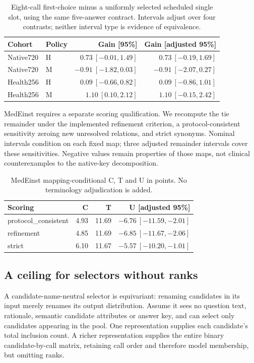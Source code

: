 \begin{table}[ht]
\centering\small
\caption{Eight-call first-choice minus a uniformly selected scheduled single slot, using the same five-answer contract. Intervals adjust over four contrasts; neither interval type is evidence of equivalence.}
\begin{tabular}{llrr}
\toprule
Cohort & Policy & Gain [95\%] & Gain [adjusted 95\%]\\
\midrule
Native720 & H & $0.73\ [-0.01,1.49]$ & $0.73\ [-0.19,1.69]$\\
Native720 & M & $-0.91\ [-1.82,0.03]$ & $-0.91\ [-2.07,0.27]$\\
Health256 & H & $0.09\ [-0.66,0.82]$ & $0.09\ [-0.86,1.01]$\\
Health256 & M & $1.10\ [0.10,2.12]$ & $1.10\ [-0.15,2.42]$\\
\bottomrule
\end{tabular}
\end{table}

MedEinst requires a separate scoring qualification. We recompute the tie remainder under the implemented refinement criterion, a protocol-consistent sensitivity zeroing new unresolved relations, and strict synonyms. Nominal intervals condition on each fixed map; three adjusted remainder intervals cover these sensitivities. Negative values remain properties of those maps, not clinical counterexamples to the native-key decomposition.

\begin{table}[ht]
\centering\small
\caption{MedEinst mapping-conditional C, T and U in points. No terminology adjudication is added.}
\begin{tabular}{lrrr}
\toprule
Scoring & C & T & U [adjusted 95\%]\\
\midrule
protocol\_consistent & 4.93 & 11.69 & $-6.76\ [-11.59,-2.01]$\\
refinement & 4.85 & 11.69 & $-6.85\ [-11.67,-2.06]$\\
strict & 6.10 & 11.67 & $-5.57\ [-10.20,-1.01]$\\
\bottomrule
\end{tabular}
\end{table}

\subsection{A ceiling for selectors without ranks}
A candidate-name-neutral selector is equivariant: renaming candidates in its input merely renames its output distribution. Assume it sees no question text, rationale, semantic candidate attributes or answer key, and can select only candidates appearing in the pool. One representation supplies each candidate's total inclusion count. A richer representation supplies the entire binary candidate-by-call matrix, retaining call order and therefore model membership, but omitting ranks.

